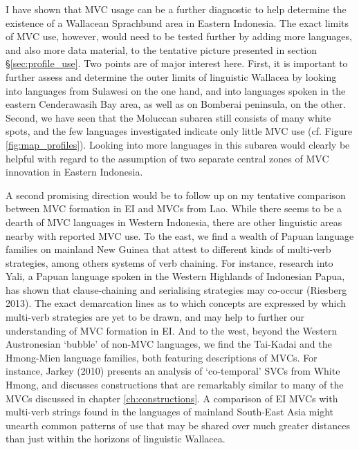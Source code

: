 I have shown that MVC usage can be a further diagnostic to help determine the existence of a Wallacean Sprachbund area in Eastern Indonesia. The exact limits of MVC use, however, would need to be tested further by adding more languages, and also more data material, to the tentative picture presented in section §\ref{sec:profile_use}. Two points are of major interest here. First, it is important to further assess and determine the outer limits of linguistic Wallacea by looking into languages from Sulawesi on the one hand, and into languages spoken in the eastern Cenderawasih Bay area, as well as on Bomberai peninsula, on the other.  Second, we have seen that the Moluccan subarea still consists of many white spots, and the few languages investigated indicate only little MVC use (cf. Figure \ref{fig:map_profiles}). Looking into more languages in this subarea would clearly be helpful with regard to the assumption of two separate central zones of MVC innovation in Eastern Indonesia.

A second promising direction would be to follow up on my tentative comparison between MVC formation in EI and MVCs from Lao. While there seems to be a dearth of MVC languages in Western Indonesia, there are other linguistic areas nearby with reported MVC use. To the east, we find a wealth of Papuan language families on mainland New Guinea that attest to different kinds of multi-verb strategies, among others systems of verb chaining. For instance, research into Yali, a Papuan language spoken in the Western Highlands of Indonesian Papua, has shown that clause-chaining and serialising strategies may co-occur (Riesberg 2013). The exact demarcation lines as to which concepts are expressed by which multi-verb strategies are yet to be drawn, and may help to further our understanding of MVC formation in EI. And to the west, beyond the Western Austronesian `bubble' of non-MVC languages, we find the Tai-Kadai and the Hmong-Mien language families, both featuring descriptions of MVCs. For instance, Jarkey (2010) presents an analysis of `co-temporal' SVCs from White Hmong, and discusses constructions that are remarkably similar to many of the MVCs discussed in chapter \ref{ch:constructions}. A comparison of EI MVCs with multi-verb strings found in the languages of mainland South-East Asia might unearth common patterns of use that may be shared over much greater distances than just within the horizons of linguistic Wallacea.

